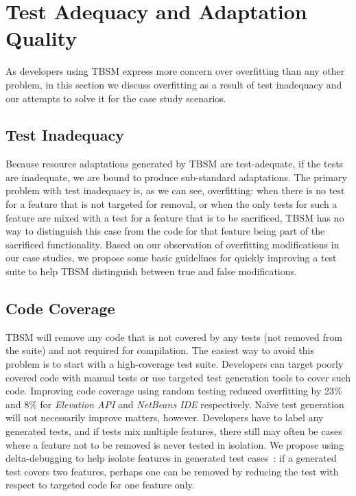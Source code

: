 \section{Test Adequacy and Adaptation Quality}
As developers using TBSM express more concern over overfitting than any other problem, in this section we discuss overfitting as a result of test inadequacy and our attempts to solve it for the case study scenarios.

\subsection{Test Inadequacy}
Because resource adaptations generated by TBSM are test-adequate, if the tests are inadequate, we are bound to produce sub-standard adaptations. The primary problem with test inadequacy is, as we can see, overfitting: when there is no test for a feature that is not targeted for removal, or when the only tests for such a feature are mixed with a test for a feature that is to be sacrificed, TBSM has no way to distinguish this case from the code for that feature being part of the sacrificed functionality. Based on our observation of overfitting modifications in our case studies, we propose some basic guidelines for quickly improving a test suite to help TBSM distinguish between true and false modifications. 

\subsection{Code Coverage} 
TBSM will remove any code that is not covered by any tests (not removed from the suite) and not required for compilation. The easiest way to avoid this problem is to start with a high-coverage test suite. Developers can target poorly covered code with manual tests or use targeted test generation tools to cover such code. Improving code coverage using random testing reduced overfitting by 23\% and 8\% for \textit{Elevation API} and \textit{NetBeans IDE} respectively. Na\"ive test generation will not necessarily improve matters, however. Developers have to label any generated tests, and if tests mix multiple features, there still may often be cases where a feature not to be removed is never tested in isolation. We propose using delta-debugging to help isolate features in generated test cases~\cite{stvrcausereduce}: if a generated test covers two features, perhaps one can be removed by reducing the test with respect to targeted code for one feature only.

